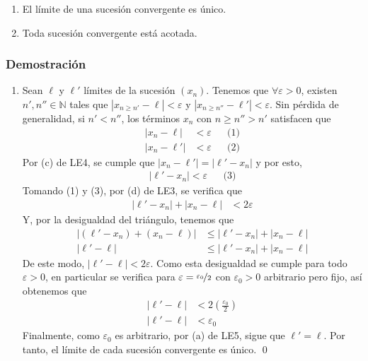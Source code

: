 \documentclass[11pt]{article}
\newcommand{\N}{\mathbb{N}}
\begin{document}
\begin{enumerate}[label=\alph*)]
    \item El límite de una sucesión convergente es único.
    \item Toda sucesión convergente está acotada.
\end{enumerate}

\subsubsection*{Demostración}

\begin{enumerate}[label=\alph*)]
    \item Sean $\ell$ y $\ell'$ límites de la sucesión $(x_n)$. Tenemos que $\forall \varepsilon>0$, existen $n',n'' \in \N$ tales que $|x_{n\geq n'}-\ell|<\varepsilon$ y $|x_{n\geq n''}-\ell'|<\varepsilon$. Sin pérdida de generalidad, si $n'<n''$, los términos $x_n$ con $n\geq n''>n'$ satisfacen que \begin{align*}
        |x_n-\ell| &<\varepsilon && \text{(1)}\\
        |x_n-\ell'| &<\varepsilon && \text{(2)}
    \end{align*}
    Por (c) de LE4, se cumple que $|x_n-\ell'|=|\ell'-x_n|$ y por esto, \begin{align*}
        |\ell'-x_n|<\varepsilon && \text{(3)}
    \end{align*}
    Tomando (1) y (3), por (d) de LE3, se verifica que \begin{align*}
        |\ell'-x_n| + |x_n-\ell| &< 2\varepsilon
    \end{align*}
    Y, por la desigualdad del triángulo, tenemos que \begin{align*}
        \big|(\ell'-x_n)+(x_n-\ell)\big| &\leq |\ell'-x_n| + |x_n-\ell|\\
        |\ell'-\ell| &\leq |\ell'-x_n| + |x_n-\ell|
    \end{align*}
    De este modo, $|\ell'-\ell| < 2\varepsilon$. Como esta desigualdad se cumple para todo $\varepsilon>0$, en particular se verifica para $\varepsilon=\nicefrac{\varepsilon_0}{2}$ con $\varepsilon_0>0$ arbitrario pero fijo, así obtenemos que \begin{align*}
        |\ell'-\ell| &< 2 \left(\frac{\varepsilon_0}{2}\right)\\
        |\ell'-\ell| &< \varepsilon_0
    \end{align*}
    Finalmente, como $\varepsilon_0$ es arbitrario, por (a) de LE5, sigue que $\ell'=\ell$. Por tanto, el límite de cada sucesión convergente es único. \qed

\end{enumerate}
\end{document}
